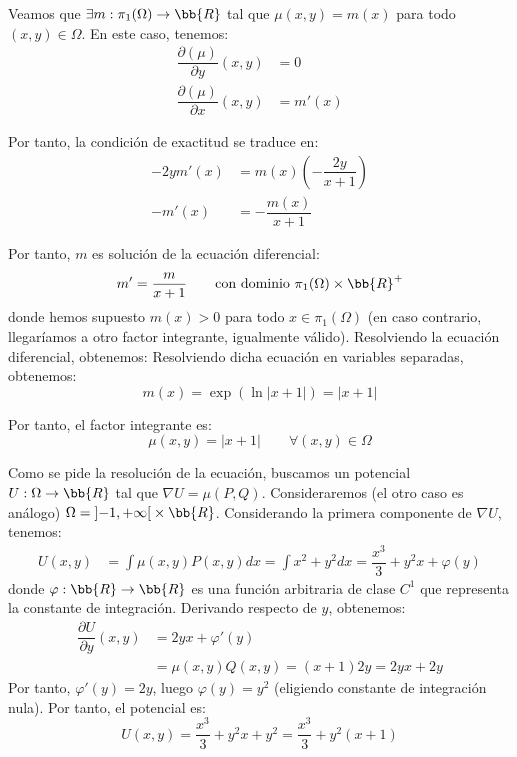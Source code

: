 \documentclass[12pt]{article}
\begin{document}
\begin{ejercicio}
    Veamos que $\exists m:\pi_1(\Omega)\to \bb{R}$ tal que $\mu(x,y)=m(x)$ para todo $(x,y)\in \Omega$. En este caso, tenemos:
    \begin{align*}
        \dfrac{\partial(\mu)}{\partial y}(x,y)&=0\\
        \dfrac{\partial(\mu)}{\partial x}(x,y)&=m'(x)
    \end{align*}

    Por tanto, la condición de exactitud se traduce en:
    \begin{align*}
        -2ym'(x) &= m(x)\left(-\dfrac{2y}{x+1}\right)\\
        -m'(x) &= -\dfrac{m(x)}{x+1}
    \end{align*}

    Por tanto, $m$ es solución de la ecuación diferencial:
    \begin{equation*}
        m'= \dfrac{m}{x+1}\qquad \text{con dominio }\pi_1(\Omega)\times \bb{R}^+
    \end{equation*}
    donde hemos supuesto $m(x)>0$ para todo $x\in \pi_1(\Omega)$ (en caso contrario, llegaríamos a otro factor integrante, igualmente válido). Resolviendo la ecuación diferencial, obtenemos:
    Resolviendo dicha ecuación en variables separadas, obtenemos:
    \begin{equation*}
        m(x)=\exp\left(\ln|x+1|\right)=|x+1|
    \end{equation*}

    Por tanto, el factor integrante es:
    \begin{equation*}
        \mu(x,y)=|x+1|\qquad \forall (x,y)\in \Omega
    \end{equation*}

    Como se pide la resolución de la ecuación, buscamos un potencial $U:\Omega\to \bb{R}$ tal que $\nabla U=\mu (P,Q)$. Consideraremos (el otro caso es análogo) $\Omega=\left]-1,+\infty\right[\times \bb{R}$. Considerando la primera componente de $\nabla U$, tenemos:
    \begin{align*}
        U(x,y)&=\int \mu(x,y)P(x,y)dx = \int x^2+y^2dx = \dfrac{x^3}{3}+y^2x+\varphi(y)
    \end{align*}
    donde $\varphi:\bb{R}\to \bb{R}$ es una función arbitraria de clase $C^1$ que representa la constante de integración. Derivando respecto de $y$, obtenemos:
    \begin{align*}
        \dfrac{\partial U}{\partial y}(x,y)&=2yx+\varphi'(y)\\
        &=\mu(x,y)Q(x,y)=(x+1)2y = 2yx+2y
    \end{align*}
    Por tanto, $\varphi'(y)=2y$, luego $\varphi(y)=y^2$ (eligiendo constante de integración nula). Por tanto, el potencial es:
    \begin{equation*}
        U(x,y)=\dfrac{x^3}{3}+y^2x + y^2 = \dfrac{x^3}{3}+y^2(x+1)
    \end{equation*}


\end{ejercicio}
\end{document}
